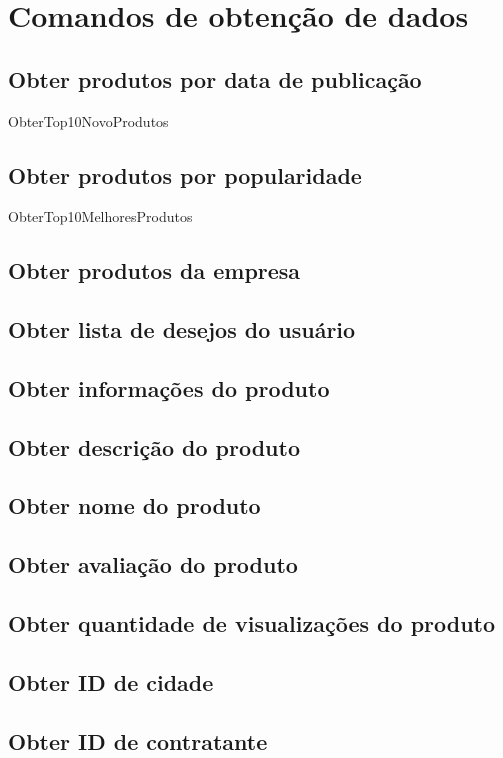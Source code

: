 \documentclass{article}
\begin{document}
	\section{Comandos de obtenção de dados}\indent
		\subsection{Obter produtos por data de publicação}
			\par ObterTop10NovoProdutos
		\subsection{Obter produtos por popularidade}
			\par ObterTop10MelhoresProdutos
		\subsection{Obter produtos da empresa}
		\subsection{Obter lista de desejos do usuário}
		\subsection{Obter informações do produto}
		\subsection{Obter descrição do produto}
		\subsection{Obter nome do produto}
		\subsection{Obter avaliação do produto}
		\subsection{Obter quantidade de visualizações do produto}
		\subsection{Obter ID de cidade}
		\subsection{Obter ID de contratante}
\end{document}
